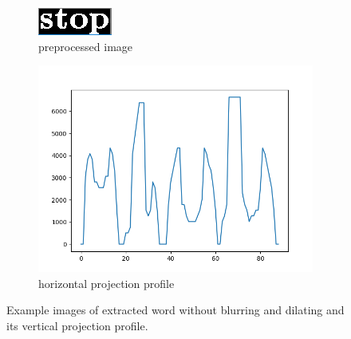 \documentclass[english, paper=a4]{scrartcl}
\begin{document}
\begin{figure}[b!]
	\centering
	\begin{subfigure}[t!]{0.40\textwidth}
		\includegraphics[width=\textwidth]{PreprocessedWord.png}
		\caption{preprocessed image}
		\label{fig:ex2a}
	\end{subfigure}
	\begin{subfigure}[t!]{0.40\textwidth}
		\includegraphics[width=\textwidth]{VertProjectionChar.png}
		\caption{horizontal projection profile}
		\label{fig:ex2b}
	\end{subfigure}
	\caption{Example images of extracted word without blurring and dilating and its vertical projection profile.}
	\label{fig:ex_proj_vert_char}
\end{figure}
\end{document}
